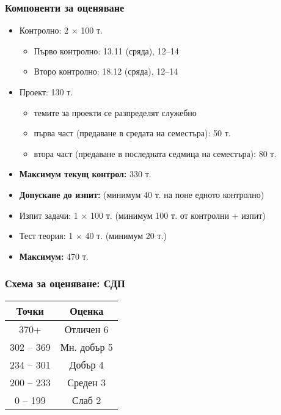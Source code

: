 \documentclass{beamer}
\begin{document}
\begin{frame}
  \frametitle{Компоненти за оценяване}

  \begin{itemize}
  \item Контролно: 2 $\times$ 100 т.
    \begin{itemize}
    \item Първо контролно: 13.11 (сряда), 12--14
    \item Второ контролно: 18.12 (сряда), 12--14
    \end{itemize}
  \item Проект: 130 т.
    \begin{itemize}
    \item темите за проекти се разпределят служебно
    \item първа част (предаване в средата на семестъра): 50 т.
    \item втора част (предаване в последната седмица на семестъра): 80 т.
    \end{itemize}
  \item \textbf{Максимум текущ контрол:} 330 т.
  \item \textbf{Допускане до изпит:} \alert{(минимум 40 т. на поне едното контролно)}
  \item Изпит задачи: 1 $\times$ 100 т. \alert{(минимум 100 т. от контролни + изпит)}
  \item Тест теория: 1 $\times$ 40 т. \alert{(минимум 20 т.)}
  \item \textbf{Максимум:} 470 т.
  \end{itemize}
\end{frame}

\begin{frame}
  \frametitle{Схема за оценяване: СДП}

  \begin{center}
    \begin{tabular}{|c|c|}
      \hline
      \textbf{Точки} & \textbf{Оценка}\\
      \hline\hline
      370+&Отличен 6\\
      \hline
      302 -- 369&Мн. добър 5\\
      \hline
      234 -- 301&Добър 4\\
      \hline
      200  -- 233&Среден 3\\
      \hline
      0  --  199&Слаб 2\\
      \hline
    \end{tabular}
  \end{center}
\end{frame}
\end{document}
